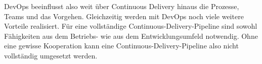 DevOps beeinflusst also weit über Continuous Delivery hinaus die Prozesse, Teams und das Vorgehen. Gleichzeitig werden mit DevOps noch viele weitere Vorteile realisiert. Für eine vollständige Continuous-Delivery-Pipeline sind sowohl Fähigkeiten aus dem Betriebs- wie aus dem Entwicklungsumfeld notwendig. Ohne eine gewisse Kooperation kann eine Continuous-Delivery-Pipeline also nicht vollständig umgesetzt werden.

\ifCLASSOPTIONcaptionsoff
  \newpage
\fi